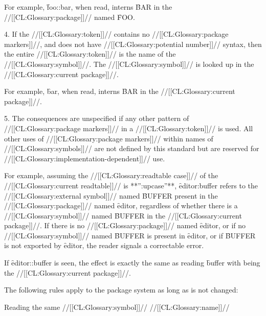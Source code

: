 For example, 
\f{foo::bar}, when read, interns \f{BAR} in the //[[CL:Glossary:package]]// named \f{FOO}.


\item{4.}
If the //[[CL:Glossary:token]]// contains no //[[CL:Glossary:package markers]]//, 
and does not have //[[CL:Glossary:potential number]]// syntax,
then the entire //[[CL:Glossary:token]]// is the name of the //[[CL:Glossary:symbol]]//.
The //[[CL:Glossary:symbol]]// is looked up in the //[[CL:Glossary:current package]]//.

For example, 
\f{bar}, when read, interns \f{BAR} in the //[[CL:Glossary:current package]]//.



\item{5.}
The consequences are unspecified if any other pattern of //[[CL:Glossary:package markers]]//
in a //[[CL:Glossary:token]]// is used.
All other uses of //[[CL:Glossary:package markers]]// within names of //[[CL:Glossary:symbols]]// 
are not defined by this standard 
but are reserved for //[[CL:Glossary:implementation-dependent]]// use.
\endlist


For example,
assuming the //[[CL:Glossary:readtable case]]// of the //[[CL:Glossary:current readtable]]// is **'':upcase''**,
\f{editor:buffer} refers to the //[[CL:Glossary:external symbol]]// 
named \f{BUFFER} present in the //[[CL:Glossary:package]]// named \f{editor},
regardless of whether there is a //[[CL:Glossary:symbol]]// named \f{BUFFER} in
the //[[CL:Glossary:current package]]//.  If there is no //[[CL:Glossary:package]]// named
\f{editor}, or if no //[[CL:Glossary:symbol]]// named \f{BUFFER}
is present in \f{editor}, or if \f{BUFFER} is not exported by
\f{editor}, the reader signals
a correctable error.

If \f{editor::buffer} is seen, the effect is exactly the same as
reading \f{buffer} with  being the //[[CL:Glossary:current package]]//.

\endsubSection%



The following rules apply to the package system as long as 
 is not changed:


\beginlist
{}



Reading the same //[[CL:Glossary:symbol]]// //[[CL:Glossary:name]]//

